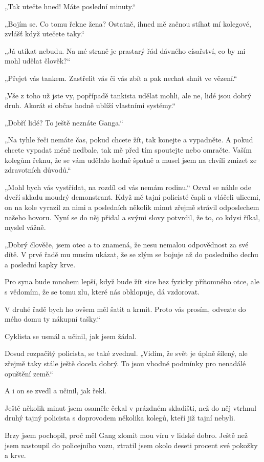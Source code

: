 „Tak utečte hned! Máte poslední minuty.“

„Bojím se. Co tomu řekne žena? Ostatně, ihned mě začnou stíhat mí kolegové, zvlášť když utečete taky.“

„Já utíkat nebudu. Na mé straně je prastarý řád dávného císařství, co by mi mohl udělat člověk?“

„Přejet vás tankem. Zastřelit vás či vás zbít a pak nechat shnít ve vězení.“

„Vše z toho už jste vy, popřípadě tankista udělat mohli, ale ne, lidé jsou dobrý druh. Akorát si občas hodně ublíží vlastními systémy.“

„Dobří lidé? To ještě neznáte Ganga.“

„Na tyhle řeči nemáte čas, pokud chcete žít, tak konejte a vypadněte. A pokud chcete vypadat méně nedbale, tak mě před tím spoutejte nebo omračte. Vaším kolegům řeknu, že se vám udělalo hodně špatně a musel jsem na chvíli zmizet ze zdravotních důvodů.“

„Mohl bych vás vystřídat, na rozdíl od vás nemám rodinu.“ Ozval se náhle ode dveří skladu moudrý demonstrant. Když mě tajní policisté čapli a vláčeli ulicemi, on na kole vyrazil za nimi a posledních několik minut zřejmě strávil odposlechem našeho hovoru. Nyní se do něj přidal a svými slovy potvrdil, že to, co kdysi říkal, myslel vážně. 

„Dobrý člověče, jsem otec a to znamená, že nesu nemalou odpovědnost za své dítě. V prvé řadě mu musím ukázat, že se zlým se bojuje až do posledního dechu a poslední kapky krve.

Pro syna bude mnohem lepší, když bude žít sice bez fyzicky přítomného otce, ale s vědomím, že se tomu zlu, které nás obklopuje, dá vzdorovat.

V druhé řadě bych ho ovšem měl šatit a krmit. Proto vás prosím, odvezte do mého domu ty nákupní tašky.“

Cyklista se usmál a učinil, jak jsem žádal.

Dosud rozpačitý policista, se také zvednul. „Vidím, že svět je úplně šílený, ale zřejmě taky stále ještě docela dobrý. To jsou vhodné podmínky pro nenadálé opuštění země.“

A i on se zvedl a učinil, jak řekl.

Ještě několik minut jsem osaměle čekal v prázdném skladišti, než do něj vtrhnul druhý tajný policista s doprovodem několika kolegů, kteří již tajní nebyli.

Brzy jsem pochopil, proč měl Gang zlomit mou víru v lidské dobro. Ještě než jsem nastoupil do policejního vozu, ztratil jsem okolo deseti procent své pokožky a krve.

